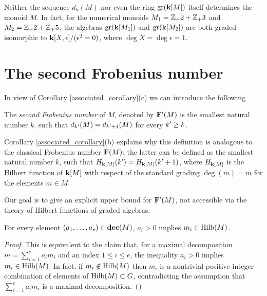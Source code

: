 \begin{example} Neither the sequence $d_k(M)$ nor even the ring $\operatorname{gr}(\mathbf{k}[M])$ itself determines the monoid $M$. In fact, for the numerical monoids $M_1=\mathbb Z_+2+\mathbb Z_+3$ and $M_2=\mathbb Z_+2+\mathbb Z_+5$, the algebras $\operatorname{gr}(\mathbf{k}[M_1])$ and $\operatorname{gr}(\mathbf{k}[M_2])$ are both graded isomorphic to $\mathbf{k}[X,\epsilon]/(\epsilon^2=0)$, where $\deg X=\deg\epsilon=1$.
\end{example}

\section{The second Frobenius number}\label{Stabilization}

In view of Corollary \ref{associated_corollary}(c) we can introduce the following

\begin{definition}\label{2nd_frob}
The \emph{second Frobenius number} of $M$, denoted by $\F\rq{}(M)$ is the smallest natural number $k$, such that $d_{k\rq{}}(M)=d_{k\rq{}+1}(M)$ for every $k\rq{} \geq k$. 
\end{definition}

Corollary \ref{associated_corollary}(b) explains why this definition is analogous to the classical Frobenius number $\mathbf{F}(M)$: the latter can be defined as the smallest natural number $k$, such that $H_{\kk[M]}(k\rq{})=H_{\kk[M]}(k\rq{}+1)$, where $H_{\mathbf{k}[M]}$ is the Hilbert function of $\mathbf{k}[M]$ with respect of the standard grading $\deg(m)=m$ for the elements $m\in M$.

Our goal is to give an explicit upper bound for $\F\rq{}(M)$, not accessible via the theory of Hilbert functions of graded algebras.

\newpage

\begin{lemma}\label{just_Hilbert}
For every element $(a_1,\ldots,a_e)\in\textbf{dec}(M)$, $a_i>0$ implies $m_i\in\operatorname{Hilb}(M)$.
\end{lemma}

\begin{proof}
This is equivalent to the claim that, for a maximal decomposition $m=\sum_{i=1}^e a_im_i$ and an index $1\le i\le e$, the inequality $a_i>0$ implies $m_i\in\operatorname{Hilb}(M)$. In fact, if $m_i\notin\operatorname{Hilb}(M)$ then $m_i$ is a nontrivial positive integer combination of elements of $\operatorname{Hilb}(M)\subset G$, contradicting the assumption that $\sum_{i=1}^e a_im_i$ is a maximal decomposition.
\end{proof}

